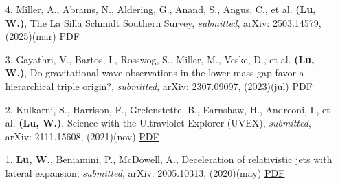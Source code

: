 \begin{itemize}[leftmargin=0.65cm]
\vspace{-0.1cm}
\item[4.]{Miller, A., Abrams, N., Aldering, G., Anand, S., Angus, C., et al. {\bf (Lu, W.)}, {The La Silla Schmidt Southern Survey}, {\it submitted}, arXiv: 2503.14579, (2025)(mar) \href{https://ui.adsabs.harvard.edu/abs/2025arXiv250314579M}{\underline{PDF}}}

\vspace{-0.1cm}
\item[3.]{Gayathri, V., Bartos, I., Rosswog, S., Miller, M., Veske, D., et al. {\bf (Lu, W.)}, {Do gravitational wave observations in the lower mass gap favor a hierarchical triple origin?}, {\it submitted}, arXiv: 2307.09097, (2023)(jul) \href{https://ui.adsabs.harvard.edu/abs/2023arXiv230709097G}{\underline{PDF}}}

\vspace{-0.1cm}
\item[2.]{Kulkarni, S., Harrison, F., Grefenstette, B., Earnshaw, H., Andreoni, I., et al. {\bf (Lu, W.)}, {Science with the Ultraviolet Explorer (UVEX)}, {\it submitted}, arXiv: 2111.15608, (2021)(nov) \href{https://ui.adsabs.harvard.edu/abs/2021arXiv211115608K}{\underline{PDF}}}

\vspace{-0.1cm}
\item[1.]{{\bf Lu, W.}, Beniamini, P., McDowell, A., {Deceleration of relativistic jets with lateral expansion}, {\it submitted}, arXiv: 2005.10313, (2020)(may) \href{https://ui.adsabs.harvard.edu/abs/2020arXiv200510313L}{\underline{PDF}}}
\end{itemize}